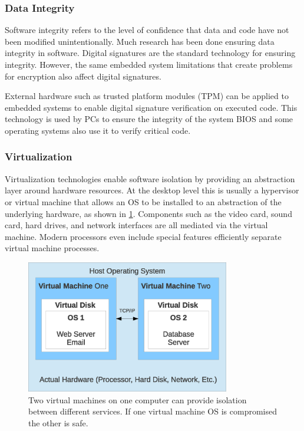\documentclass[final,conference,11pt]{IEEEtran}
\begin{document}
\subsubsection{Data Integrity}
Software integrity refers to the level of confidence that data and code have not been modified unintentionally.  Much research has been done ensuring data integrity in software.  Digital signatures are the standard technology for ensuring integrity. However, the same embedded system limitations that create problems for encryption also affect digital signatures.  

External hardware such as trusted platform modules (TPM) can be applied to embedded systems to enable digital signature verification on executed code.  This technology is used by PCs to ensure the integrity of the system BIOS and some operating systems also use it to verify critical code.  

\subsubsection{Virtualization}
Virtualization technologies enable software isolation by providing an abstraction layer around hardware resources.  At the desktop level this is usually a hypervisor or virtual machine that allows an OS to be installed to an abstraction of the underlying hardware, as shown in \figurename \ref{fig:virtual}.  Components such as the video card, sound card, hard drives, and network interfaces are all mediated via the virtual machine.  Modern processors even include special features efficiently separate virtual machine processes. 

\begin{figure}[!t]
\centering
\includegraphics[width=3.5in]{virtual}
\caption{Two virtual machines on one computer can provide isolation between different services.  If one virtual machine OS is compromised the other is safe.}
\label{fig:virtual}
\end{figure}
\end{document}
